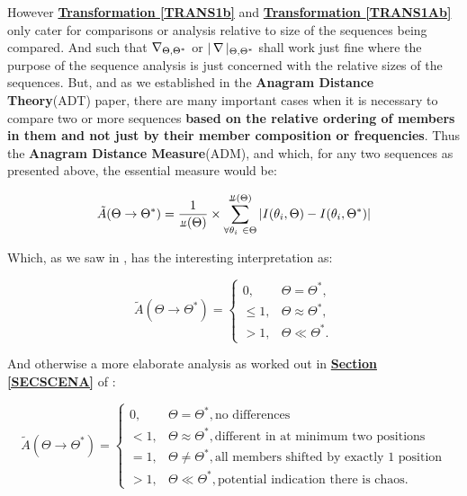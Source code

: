 \documentclass[a4paper, 18pt]{book} %
\newcommand{\invdel}[1]{\mathop{\rotatebox[origin=c]{180}{$\Delta$}}#1}
\newcommand{\invpi}{\rotatebox[origin=c]{180}{$\pi$}}
\begin{document}
However \textbf{\hyperref[TRANS1b]{Transformation \ref{TRANS1b}}} and \textbf{\hyperref[TRANS1Ab]{Transformation \ref{TRANS1Ab}}} only cater for comparisons or analysis relative to size of the sequences being compared. And such that $\invdel_{\Theta,\Theta^*}$ or $|\invdel|_{\Theta,\Theta^*}$ shall work just fine where the purpose of the sequence analysis is just concerned with the relative sizes of the sequences. But, and as we established in the \textbf{Anagram Distance Theory}(ADT) paper\cite{adtpaper}, there are many important cases when it is necessary to compare two or more sequences \textbf{based on the relative ordering of members in them and not just by their member composition or frequencies}. Thus the \textbf{Anagram Distance Measure}(ADM), and which, for any two sequences as presented above, the essential measure would be:

\vspace{1em}
\begin{equation}
\tilde{A}(\Theta \rightarrow \Theta^*) = \frac{1}{\invpi(\Theta)} \times \sum\limits_{\forall \theta_i \ \in \Theta}^{\invpi(\Theta)} | I(\theta_i,\Theta) - I(\theta_i,\Theta^*)|
\end{equation} 
\vspace{1em}

Which, as we saw in \cite{adtpaper}, has the interesting interpretation as:

\vspace{1em}
\begin{equation}
\label{EQTHETb}
\tilde{A}(\Theta \rightarrow \Theta^*) = \begin{cases}
0, & \Theta = \Theta^*, \\
\leq 1, & \Theta \approx \Theta^*, \\
> 1, & \Theta \ll \Theta^*.
\end{cases}
\end{equation}
\vspace{1em}

And otherwise a more elaborate analysis as worked out in \textbf{\hyperref[SECSCENA]{Section \ref{SECSCENA}}} of \cite{lutalo_2025_trans_genetics}: 

\vspace{1em}
\begin{equation}
\label{EQINTADMTHESb}
\tilde{A}(\Theta \rightarrow \Theta^*) = \begin{cases}
0, & \Theta = \Theta^*,  \text{no differences}\\
< 1, & \Theta \approx \Theta^*, \text{different in at minimum two positions}\\
= 1, & \Theta \neq \Theta^*, \text{all members shifted by exactly 1 position}\\
> 1, & \Theta \ll \Theta^*, \text{potential indication there is chaos.}
\end{cases}
\end{equation}
\vspace{1em}
\end{document}
